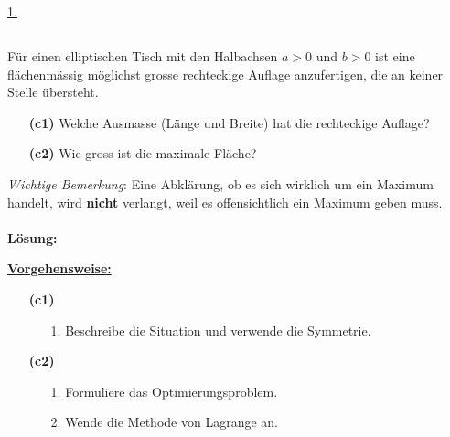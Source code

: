 \underline{1. }\\


\newpage
\subsection*{}
Für einen elliptischen Tisch mit den Halbachsen $ a > 0  $ und $ b > 0 $ ist eine flächenmässig möglichst grosse rechteckige Auflage anzufertigen, die an keiner Stelle übersteht.
\begin{enumerate}
	\item[\textbf{(c1)}]
	Welche Ausmasse (Länge und Breite) hat die rechteckige Auflage?
	\item[\textbf{(c2)}]
	Wie gross ist die maximale Fläche?
\end{enumerate}
\textit{Wichtige Bemerkung}: Eine Abklärung, ob es sich wirklich um ein Maximum handelt, wird \textbf{nicht} verlangt, weil es offensichtlich ein Maximum geben muss.
\\ \\
\textbf{Lösung:}
\begin{mdframed}
\underline{\textbf{Vorgehensweise:}}
\begin{enumerate}
\item[\textbf{(c1)}]
\begin{enumerate}
	\item[1.] Beschreibe die Situation und verwende die Symmetrie. 
\end{enumerate} 
\item[\textbf{(c2)}] 
\begin{enumerate}
	\item[1.] Formuliere das Optimierungsproblem.
	\item[2.] Wende die Methode von Lagrange an. 
\end{enumerate}
\end{enumerate}
\end{mdframed}


